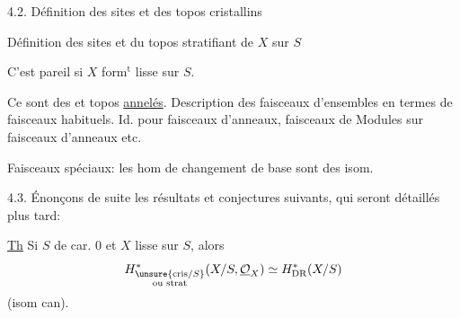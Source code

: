 4.2. Définition des sites et des topos cristallins 

Définition des sites et du topos stratifiant de $X$ sur $S$

C'est pareil si $X$ form$^{\mathrm{t}}$ lisse sur $S$.

Ce sont des  et topos \uline{annelés}.
Description des  faisceaux d'ensembles en termes de faisceaux habituels. Id. pour faisceaux d'anneaux, faisceaux de Modules sur faisceaux d'anneaux etc.

Faisceaux spéciaux: les hom de changement de base sont des isom.


4.3. Énonçons de suite les résultats et conjectures suivants, qui seront  détaillés plus tard:

\uline{Th} Si $S$ de car. 0 et $X$ lisse sur $S$, alors
\[
H^*_{\substack{\unsure{\mathrm{cris}/S}\\\text{ou strat}}}
(X/S,\underline{\mathcal{O}}_X)\simeq H^*_{\mathrm{DR}}(X/S)
\]
(isom can).
\deleted{\unsure{on a} $\unsure{f}=\mathbb{R}f_*(\mathcal{O}_X)$ \unsure{puis} $\uline{\unsure{H^i=0}}$, et
\[
(\mathbb{R}\unsure{f_{\mathrm{str}*}|f_*}(\mathcal{O}_X)^{\unsure{\mathrm{an}|\mathrm{ab}}}
\simeq\mathbb{R}f_*(\Omega^{\unsure{\bullet}}_{X/S})\quad ....]
\]}

